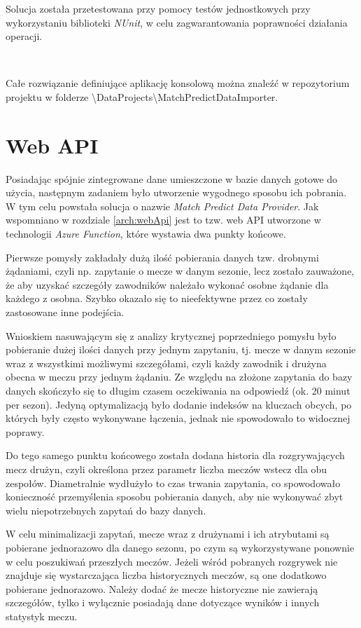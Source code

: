         Solucja została przetestowana przy pomocy testów jednostkowych przy wykorzystaniu biblioteki \textit{NUnit}, w celu zagwarantowania poprawności działania operacji.
        
        ~
        
        Całe rozwiązanie definiujące aplikację konsolową można znaleźć w repozytorium projektu \cite{repo} w folderze \textbackslash DataProjects\textbackslash MatchPredictDataImporter.
        
        
    \section{Web API}
    \noindent
    Posiadając spójnie zintegrowane dane umieszczone w bazie danych gotowe do użycia, następnym zadaniem było utworzenie wygodnego sposobu ich pobrania. W tym celu powstała solucja o nazwie \textit{Match Predict Data Provider}. Jak wspomniano w rozdziale \ref{arch:webApi} jest to tzw. web API utworzone w technologii \textit{Azure Function}, które wystawia dwa punkty końcowe. 
    
    Pierwsze pomysły zakładały dużą ilość pobierania danych tzw. drobnymi żądaniami, czyli np. zapytanie o mecze w danym sezonie, lecz zostało zauważone, że aby uzyskać szczegóły zawodników należało wykonać osobne żądanie dla każdego z osobna. Szybko okazało się to nieefektywne przez co zostały zastosowane inne podejścia.
    
    Wnioskiem nasuwającym się z analizy krytycznej poprzedniego pomysłu było pobieranie dużej ilości danych przy jednym zapytaniu, tj. mecze w danym sezonie wraz z wszystkimi możliwymi szczegółami, czyli każdy zawodnik i drużyna obecna w meczu przy jednym żądaniu. Ze względu na złożone zapytania do bazy danych skończyło się to długim czasem oczekiwania na odpowiedź (ok. 20 minut per sezon). Jedyną optymalizacją było dodanie indeksów na kluczach obcych, po których były często wykonywane łączenia, jednak nie spowodowało to widocznej poprawy. 
    
    Do tego samego punktu końcowego została dodana historia dla rozgrywających mecz drużyn, czyli określona przez parametr liczba meczów wstecz dla obu zespołów. Diametralnie wydłużyło to czas trwania zapytania, co spowodowało konieczność przemyślenia sposobu pobierania danych, aby nie wykonywać zbyt wielu niepotrzebnych zapytań do bazy danych.
    
    W celu minimalizacji zapytań, mecze wraz z drużynami i ich atrybutami są pobierane jednorazowo dla danego sezonu, po czym są wykorzystywane ponownie w celu poszukiwań przeszłych meczów. Jeżeli wśród pobranych rozgrywek nie znajduje się wystarczająca liczba historycznych meczów, są one dodatkowo pobierane jednorazowo. Należy dodać że mecze historyczne nie zawierają szczegółów, tylko i wyłącznie posiadają dane dotyczące wyników i innych statystyk meczu.
    
